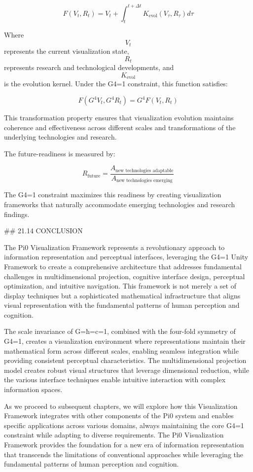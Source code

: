 $$ F(V_t, R_t) = V_t + \int_t^{t+\Delta t} K_{\text{evol}}(V_\tau, R_\tau) d\tau $$

Where $$ V_t $$ represents the current visualization state, $$ R_t $$ represents research and technological developments, and $$ K_{\text{evol}} $$ is the evolution kernel. Under the G4=1 constraint, this function satisfies:

$$ F(G^4 V_t, G^4 R_t) = G^4 F(V_t, R_t) $$

This transformation property ensures that visualization evolution maintains coherence and effectiveness across different scales and transformations of the underlying technologies and research.

The future-readiness is measured by:

$$ R_{\text{future}} = \frac{A_{\text{new technologies adaptable}}}{A_{\text{new technologies emerging}}} $$

The G4=1 constraint maximizes this readiness by creating visualization frameworks that naturally accommodate emerging technologies and research findings.

## 21.14 CONCLUSION

The Pi0 Visualization Framework represents a revolutionary approach to information representation and perceptual interfaces, leveraging the G4=1 Unity Framework to create a comprehensive architecture that addresses fundamental challenges in multidimensional projection, cognitive interface design, perceptual optimization, and intuitive navigation. This framework is not merely a set of display techniques but a sophisticated mathematical infrastructure that aligns visual representation with the fundamental patterns of human perception and cognition.

The scale invariance of G=ħ=c=1, combined with the four-fold symmetry of G4=1, creates a visualization environment where representations maintain their mathematical form across different scales, enabling seamless integration while providing consistent perceptual characteristics. The multidimensional projection model creates robust visual structures that leverage dimensional reduction, while the various interface techniques enable intuitive interaction with complex information spaces.

As we proceed to subsequent chapters, we will explore how this Visualization Framework integrates with other components of the Pi0 system and enables specific applications across various domains, always maintaining the core G4=1 constraint while adapting to diverse requirements. The Pi0 Visualization Framework provides the foundation for a new era of information representation that transcends the limitations of conventional approaches while leveraging the fundamental patterns of human perception and cognition.

